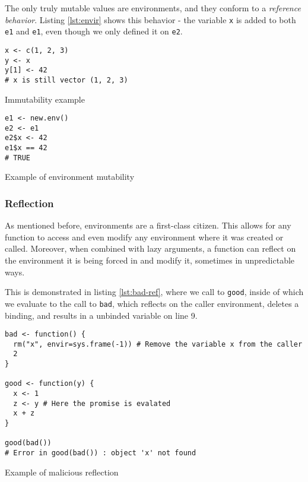 The only truly mutable values are environments, and they conform to a \textit{reference behavior}. Listing \ref{lst:envir} shows this behavior - the variable \texttt{x} is added to both \texttt{e1} and \texttt{e1}, even though we only defined it on \texttt{e2}.

\begin{listing}[h!]
  \centering
	\begin{minipage}{0.47\textwidth}
			\begin{verbatim}
x <- c(1, 2, 3)
y <- x
y[1] <- 42
# x is still vector (1, 2, 3)
      \end{verbatim}
			\caption{Immutability example}\label{lst:imm}
	\end{minipage}
	\hfill
	\begin{minipage}{0.47\textwidth}
			\begin{verbatim}
e1 <- new.env()
e2 <- e1
e2$x <- 42
e1$x == 42
# TRUE
      \end{verbatim}
			\caption{Example of environment mutability}\label{lst:envir}
	\end{minipage}
\end{listing}

\subsubsection*{Reflection}

As mentioned before, environments are a first-class citizen. This allows for any function to access and even modify any environment where it was created or called. Moreover, when combined with lazy arguments, a function can reflect on the environment it is being forced in and modify it, sometimes in unpredictable ways.

This is demonstrated in listing \ref{lst:bad-ref}, where we call to \texttt{good}, inside of which we evaluate to the call to \texttt{bad}, which reflects on the caller environment, deletes a binding, and results in a unbinded variable on line 9.

\begin{listing}
	\centering
	\begin{verbatim}
bad <- function() {
  rm("x", envir=sys.frame(-1)) # Remove the variable x from the caller
  2
}

good <- function(y) {
  x <- 1
  z <- y # Here the promise is evalated
  x + z
}

good(bad())
# Error in good(bad()) : object 'x' not found
  \end{verbatim}
	\caption{Example of malicious reflection\todocite}\label{lst:bad-ref}
\end{listing}

